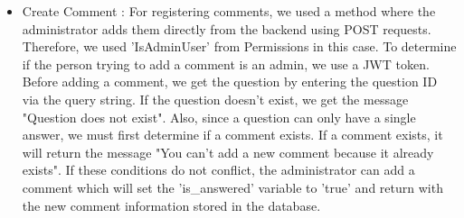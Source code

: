 \documentclass[conference, a4paper]{IEEEtran}
\begin{document}
\begin{enumerate}
\begin{itemize}
\begin{itemize}
\begin{itemize}
            \item Create Comment : For registering comments, we used a method where the administrator adds them directly from the backend using POST requests. Therefore, we used 'IsAdminUser' from Permissions in this case. To determine if the person trying to add a comment is an admin, we use a JWT token. Before adding a comment, we get the question by entering the question ID via the query string. If the question doesn't exist, we get the message "Question does not exist". Also, since a question can only have a single answer, we must first determine if a comment exists. If a comment exists, it will return the message "You can't add a new comment because it already exists". If these conditions do not conflict, the administrator can add a comment which will set the 'is\_answered' variable to 'true' and return with the new comment information stored in the database.
        \end{itemize}
    \end{itemize}


\end{itemize}
\end{enumerate}
\end{document}
